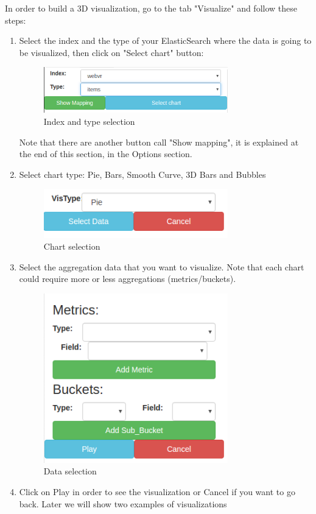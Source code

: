 \documentclass[a4paper, 12pt]{book}
\begin{document}
In order to build a 3D visualization, go to the tab "Visualize" and follow these steps:
\begin{enumerate}
    \item Select the index and the type of your ElasticSearch where the data is going to be visualized, then click on "Select chart" button:
    \begin{figure}[H]
      \centering
      \includegraphics[width=8cm, keepaspectratio]{img/results/selectindex}
      \caption{Index and type selection}
      \label{fig:onlynodes}
    \end{figure}
    Note that there are another button call "Show mapping", it is explained at the end of this section, in the Options section.
    \item Select chart type: Pie, Bars, Smooth Curve, 3D Bars and Bubbles
    \begin{figure}[H]
      \centering
      \includegraphics[width=8cm, keepaspectratio]{img/results/selectvistype}
      \caption{Chart selection}
      \label{fig:onlynodes}
    \end{figure}
    \item Select the aggregation data that you want to visualize. Note that each chart could require more or less aggregations (metrics/buckets).
    \begin{figure}[H]
      \centering
      \includegraphics[width=8cm, keepaspectratio]{img/results/selectdata}
      \caption{Data selection}
      \label{fig:onlynodes}
    \end{figure}
    \item Click on Play in order to see the visualization or Cancel if you want to go back. Later we will show two examples of visualizations
\end{enumerate}
\end{document}
